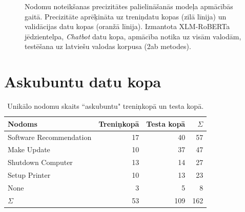 \begin{figure}[h] 
   \centering
   \caption{Nodomu noteikšanas precizitātes palielināšanās modeļa apmācībās gaitā. Precizitāte aprēķināta uz treniņdatu kopas (zilā līnija) un validācijas datu kopas (oranžā līnija). Izmantota XLM-RoBERTa jēdzientelpa, \textit{Chatbot} datu kopa, apmācība notika uz visām valodām, testēšana uz latviešu valodas korpusa (2ab metodes).} 
   \label{fig:chatbot-xlm-all}
\end{figure}



\section{Askubuntu datu kopa}

\begin{table}[htbp]
  \centering
  \caption{Unikālo nodomu skaits “askubuntu" treniņkopā un testa kopā.}
    \begin{tabular}{lrrr} \toprule
    Nodoms & Treniņkopā & Testa kopā & $\Sigma$ \\\midrule
    Software Recommendation & 17    & 40 & 57 \\
    Make Update & 10    & 37 & 47 \\
    Shutdown Computer & 13    & 14 & 27 \\
    Setup Printer & 10    & 13 & 23\\
    None  & 3     & 5 & 8\\
   $\Sigma$ & 53    & 109 & 162 \\\bottomrule
    \end{tabular}%
  \label{tab:askubuntu-labels}%
\end{table}%



